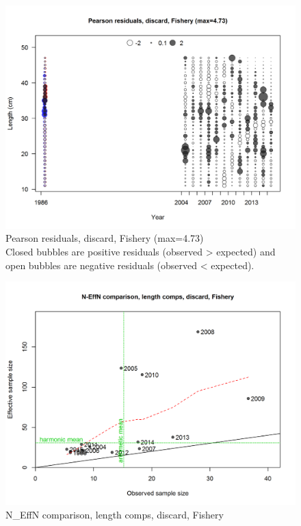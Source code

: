 \documentclass[12pt,]{article}
\begin{document}
\begin{figure}
\centering
\includegraphics{./r4ss/plots_mod1/comp_lenfit_residsflt1mkt1.png}
\caption{Pearson residuals, discard, Fishery (max=4.73)\\
Closed bubbles are positive residuals (observed \textgreater{} expected)
and open bubbles are negative residuals (observed \textless{} expected).
\label{fig:mod1_2_comp_lenfit_residsflt1mkt1}}
\end{figure}

\begin{figure}
\centering
\includegraphics{./r4ss/plots_mod1/comp_lenfit_sampsize_flt1mkt1.png}
\caption{N\_EffN comparison, length comps, discard, Fishery
\label{fig:mod1_3_comp_lenfit_sampsize_flt1mkt1}}
\end{figure}
\end{document}
